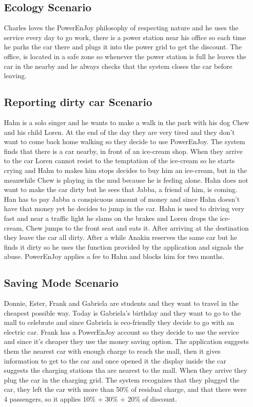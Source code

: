 \subsection{Ecology Scenario}
Charles loves the PowerEnJoy philosophy of respecting nature and he uses the service every day to go work, there is a power station near his office so each time he parks the car there and plugs it into the power grid to get the discount. The office, is located in a safe zone so whenever the power station is full he leaves the car in the nearby and he always checks that the system closes the car before leaving.

\subsection{Reporting dirty car Scenario}
Hahn is a solo singer and he wants to make a walk in the park with his dog Chew and his child Loren. At the end of the day they are very tired and they don't want to come back home walking so they decide to use PowerEnJoy. The system finds that there is a car nearby, in front of an ice-cream shop. When they arrive to the car Loren cannot resist to the temptation of the ice-cream so he starts crying and Hahn to makes him stops decides to buy him an ice-cream, but in the meanwhile Chew is playing in the mud because he is feeling alone. Hahn does not want to make the car dirty but he sees that Jabba, a friend of him, is coming. Han has to pay Jabba a conspicuous amount of money and since Hahn doesn't have that money yet he decides to jump in the car. Hahn is used to driving very fast and near a traffic light he slams on the brakes and Loren drops the ice-cream, Chew jumps to the front seat and eats it. After arriving at the destination they leave the car all dirty. After a while Anakin reserves the same car but he finds it dirty so he uses the function provided by the application and signals the abuse. PowerEnJoy applies a fee to Hahn and blocks him for two months.

\subsection{Saving Mode Scenario}
Donnie, Ester, Frank and Gabriela are students and they want to travel in the cheapest possible way. Today is Gabriela's birthday and they want to go to the mall to celebrate and since Gabriela is eco-friendly they decide to go with an electric car. Frank has a PowerEnJoy account so they decide to use the service and since it's cheaper they use the money saving option. The application suggests them the nearest car with enough charge to reach the mall, then it gives information to get to the car and once opened it the display inside the car suggests the charging stations tha are nearest to the mall. When they arrive they plug the car in the charging grid. The system recognizes that they plugged the car, they left the car with more than 50\% of residual charge, and that there were 4 passengers, so it applies 10\% + 30\% + 20\% of discount.